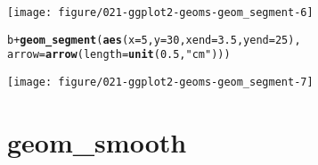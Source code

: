 \documentclass[a4paper,titlepage]{tufte-handout}\usepackage[]{graphicx}\usepackage[]{color}
\makeatletter
\def\maxwidth{ %
  \ifdim\Gin@nat@width>\linewidth
    \linewidth
  \else
    \Gin@nat@width
  \fi
}
\newcommand{\hlnum}[1]{\textcolor[rgb]{0.686,0.059,0.569}{#1}}%
\newcommand{\hlstr}[1]{\textcolor[rgb]{0.192,0.494,0.8}{#1}}%
\newcommand{\hlopt}[1]{\textcolor[rgb]{0,0,0}{#1}}%
\newcommand{\hlstd}[1]{\textcolor[rgb]{0.345,0.345,0.345}{#1}}%
\newcommand{\hlkwc}[1]{\textcolor[rgb]{0.333,0.667,0.333}{#1}}%
\newcommand{\hlkwd}[1]{\textcolor[rgb]{0.737,0.353,0.396}{\textbf{#1}}}%
\newenvironment{kframe}{%
 \def\at@end@of@kframe{}%
 \ifinner\ifhmode%
  \def\at@end@of@kframe{\end{minipage}}%
  \begin{minipage}{\columnwidth}%
 \fi\fi%
 \def\FrameCommand##1{\hskip\@totalleftmargin \hskip-\fboxsep
 \colorbox{shadecolor}{##1}\hskip-\fboxsep
     \hskip-\linewidth \hskip-\@totalleftmargin \hskip\columnwidth}%
 \MakeFramed {\advance\hsize-\width
   \@totalleftmargin\z@ \linewidth\hsize
   \@setminipage}}%
 {\par\unskip\endMakeFramed%
 \at@end@of@kframe}
\newenvironment{knitrout}{}{} %
\makeatother
\begin{document}
\begin{knitrout}
\begin{kframe}
\begin{alltt}
\end{alltt}
\end{kframe}
\texttt{[image: figure/021-ggplot2-geoms-geom\_segment-6]} 
\begin{kframe}\begin{alltt}
\hlstd{b} \hlopt{+} \hlkwd{geom_segment}\hlstd{(}\hlkwd{aes}\hlstd{(}\hlkwc{x} \hlstd{=} \hlnum{5}\hlstd{,} \hlkwc{y} \hlstd{=} \hlnum{30}\hlstd{,} \hlkwc{xend} \hlstd{=} \hlnum{3.5}\hlstd{,} \hlkwc{yend} \hlstd{=} \hlnum{25}\hlstd{),}
   \hlkwc{arrow} \hlstd{=} \hlkwd{arrow}\hlstd{(}\hlkwc{length} \hlstd{=} \hlkwd{unit}\hlstd{(}\hlnum{0.5}\hlstd{,} \hlstr{"cm"}\hlstd{)))}
\end{alltt}
\end{kframe}
\texttt{[image: figure/021-ggplot2-geoms-geom\_segment-7]} 

\end{knitrout}


\section{geom\_smooth}
\end{document}
